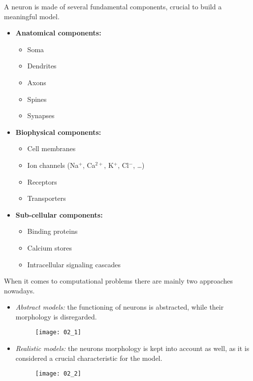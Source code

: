 A neuron is made of several fundamental components, crucial to build a meaningful model.
\begin{itemize}
    \item \textbf{Anatomical components:}
          \begin{itemize}
              \item Soma
              \item Dendrites
              \item Axons
              \item Spines
              \item Synapses
          \end{itemize}
    \item \textbf{Biophysical components:}
          \begin{itemize}
              \item Cell membranes
              \item Ion channels (Na\({}^{+}\), Ca\({}^{2+}\), K\({}^{+}\), Cl\({}^{-}\), \dots)
              \item Receptors
              \item Transporters
          \end{itemize}
    \item \textbf{Sub-cellular components:}
          \begin{itemize}
              \item Binding proteins
              \item Calcium stores
              \item Intracellular signaling cascades
          \end{itemize}
\end{itemize}
When it comes to computational problems there are mainly two approaches nowadays.
\begin{itemize}
    \item \textit{Abstract models:} the functioning of neurons is abstracted, while their morphology
          is disregarded.
          \begin{figure}[H]
              \texttt{[image: 02\_1]}
              \centering
          \end{figure}
    \item \textit{Realistic models:} the neurons morphology is kept into account as well, as it is
          considered a crucial characteristic for the model.
          \begin{figure}[H]
              \texttt{[image: 02\_2]}
              \centering
          \end{figure}
\end{itemize}
